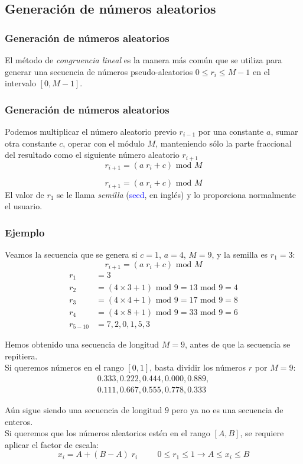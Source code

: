 \subsection{Generación de números aleatorios}
\begin{frame}
\frametitle{Generación de números aleatorios}
El método de \emph{congruencia lineal} es la manera más común que se utiliza para generar una
secuencia de números pseudo-aleatorios $0 \leq r_{i} \leq M - 1$ en el intervalo $[0, M -1]$.
\end{frame}
\begin{frame}
\frametitle{Generación de números aleatorios}
Podemos multiplicar el número aleatorio previo $r_{i-1}$ por una constante $a$, sumar otra constante $c$, operar con el módulo $M$, manteniendo sólo la parte fraccional del resultado como el siguiente número aleatorio $r_{i+1}$
\[ r_{i+1} = (a \; r_{i} + c) \mbox{ mod } M \]
\end{frame}
\begin{frame}
\[ r_{i+1} = (a \; r_{i} + c) \mbox{ mod } M \]
El valor de $r_{1}$ se le llama \emph{semilla} (\textcolor{blue}{seed}, en inglés) y lo proporciona normalmente el usuario.
\end{frame}
\begin{frame}
\frametitle{Ejemplo}
Veamos la secuencia que se genera si $c = 1$, $a = 4$, $M = 9$, y la semilla es $r_{1} = 3$:
\[ r_{i+1} = (a \; r_{i} + c) \mbox{ mod } M \]
\begin{align*}
r_{1} &= 3 \\
r_{2} &= (4 \times 3  + 1) \mbox{ mod } 9 = 13 \mbox{ mod } 9 = 4 \\
r_{3} &= (4 \times 4  + 1) \mbox{ mod } 9 = 17 \mbox{ mod } 9 = 8 \\
r_{4} &= (4 \times 8  + 1) \mbox{ mod } 9 = 33 \mbox{ mod } 9 = 6 \\
r_{5 - 10} &= 7, 2, 0, 1, 5, 3
\end{align*}
\end{frame}
\begin{frame}
Hemos obtenido una secuencia de longitud $M = 9$, antes de que la secuencia se repitiera.
\\
\bigskip
Si queremos números en el rango $[0, 1]$, basta dividir los números $r$ por $M = 9$:
\[ \begin{split}
0.333, 0.222, 0.444, 0.000, 0.889, \\
0.111, 0.667, 0.555, 0.778, 0.333 \end{split} \]
\end{frame}
\begin{frame}
Aún sigue siendo una secuencia de longitud $9$ pero ya no es una secuencia de enteros.
\\
\bigskip
Si queremos que los números aleatorios estén en el rango $[A, B]$, se requiere aplicar el factor de escala:
\[ x_{i} = A + (B - A) \; r_{i} \hspace{1cm} 0 \leq r_{1} \leq 1 \rightarrow A \leq x_{i} \leq B \]
\end{frame}
